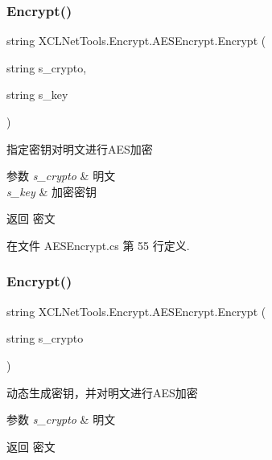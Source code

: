 \subsubsection{\texorpdfstring{Encrypt()}{Encrypt()}\hspace{0.1cm}{\footnotesize\ttfamily [1/2]}}
{\footnotesize\ttfamily string X\+C\+L\+Net\+Tools.\+Encrypt.\+A\+E\+S\+Encrypt.\+Encrypt (\begin{DoxyParamCaption}\item[{string}]{s\+\_\+crypto,  }\item[{string}]{s\+\_\+key }\end{DoxyParamCaption})}



指定密钥对明文进行\+A\+E\+S加密 


\begin{DoxyParams}{参数}
{\em s\+\_\+crypto} & 明文\\
\hline
{\em s\+\_\+key} & 加密密钥\\
\hline
\end{DoxyParams}
\begin{DoxyReturn}{返回}
密文
\end{DoxyReturn}


在文件 A\+E\+S\+Encrypt.\+cs 第 55 行定义.

\mbox{\label{class_x_c_l_net_tools_1_1_encrypt_1_1_a_e_s_encrypt_a7c3fb0d592414659abd08468847c374f}} 
\subsubsection{\texorpdfstring{Encrypt()}{Encrypt()}\hspace{0.1cm}{\footnotesize\ttfamily [2/2]}}
{\footnotesize\ttfamily string X\+C\+L\+Net\+Tools.\+Encrypt.\+A\+E\+S\+Encrypt.\+Encrypt (\begin{DoxyParamCaption}\item[{string}]{s\+\_\+crypto }\end{DoxyParamCaption})}



动态生成密钥，并对明文进行\+A\+E\+S加密 


\begin{DoxyParams}{参数}
{\em s\+\_\+crypto} & 明文\\
\hline
\end{DoxyParams}
\begin{DoxyReturn}{返回}
密文
\end{DoxyReturn}


